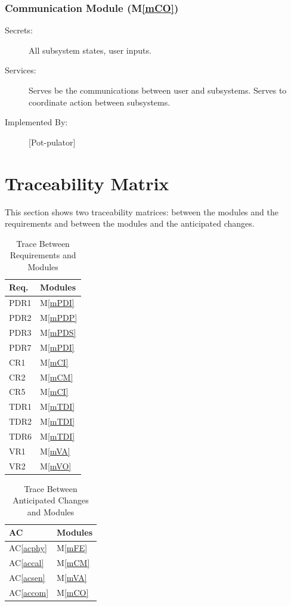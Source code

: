 \documentclass[12pt, titlepage]{article}
\newcommand{\acref}[1]{AC\ref{#1}}
\newcommand{\mref}[1]{M\ref{#1}}
\begin{document}
\subsubsection{Communication Module (\mref{mCO})}
\begin{description}
\item[Secrets:] All subsystem states, user inputs.
\item[Services:] Serves be the communications between user and subsystems. Serves to coordinate action between subsystems.
\item[Implemented By:] [Pot-pulator]

\end{description}

\section{Traceability Matrix} \label{SecTM}

This section shows two traceability matrices: between the modules and the
requirements and between the modules and the anticipated changes.

\begin{table}[H]
\centering
\begin{tabular}{p{} p{}}
\toprule
\textbf{Req.} & \textbf{Modules}\\
\midrule
PDR1 & \mref{mPDI} \\
PDR2 & \mref{mPDP} \\
PDR3 & \mref{mPDS} \\
PDR7 & \mref{mPDI} \\
CR1 &  \mref{mCI}  \\
CR2 &  \mref{mCM}  \\
CR5 &  \mref{mCI}  \\
TDR1 & \mref{mTDI} \\
TDR2 & \mref{mTDI} \\
TDR6 & \mref{mTDI} \\
VR1 &  \mref{mVA}  \\
VR2 &  \mref{mVO}  \\
\bottomrule
\end{tabular}
\caption{Trace Between Requirements and Modules}
\label{TblRT}
\end{table}

\begin{table}[H]
\centering
\begin{tabular}{p{} p{}}
\toprule
\textbf{AC} & \textbf{Modules}\\
\midrule
\acref{acphy} & \mref{mFE}\\
\acref{accal} & \mref{mCM}\\
\acref{acsen} & \mref{mVA}\\
\acref{accom} & \mref{mCO}\\


\bottomrule
\end{tabular}
\caption{Trace Between Anticipated Changes and Modules}
\label{TblACT}
\end{table}
\end{document}
